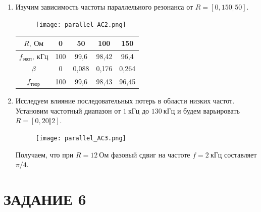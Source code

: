 \documentclass[a4paper, 12pt]{article}%
\begin{document}
\begin{enumerate}
\item Изучим зависимость частоты параллельного резонанса от $R = [0, 150 \Vert 50]$.

\begin{figure}[h!]
\centering
\texttt{[image: parallel\_AC2.png]}
\label{fig:Image1}
\end{figure}

\begin{center}
\begin{tabular}{|c|c|c|c|c|}
\hline
$R, \: \textit{Ом}$ & 0 & 50 & 100 & 150 \\
\hline
$f_{\textit{эксп}}, \: \textit{кГц}$ & 100 & 99,6 & 98,42 & 96,4 \\
\hline
$\beta$ & 0 & 0,088 & 0,176 & 0,264 \\
\hline
$f_{\textit{теор}}$ & 100 & 99,6 & 98,43 & 96,45 \\
\hline
\end{tabular}
\end{center}

\item Исследуем влияние последовательных потерь в области низких частот. Установим частотный диапазон от $1 \: \textit{кГц}$ до $130 \: \textit{кГц}$ и будем варьировать $R = [0,20 \Vert 2]$.

\begin{figure}[h!]
\centering
\texttt{[image: parallel\_AC3.png]}
\label{fig:Image1}
\end{figure}

Получаем, что при $R = 12 \: \textit{Ом}$ фазовый сдвиг на частоте $f = 2 \: \textit{кГц}$ составляет $\pi / 4$.

\end{enumerate}

\section*{ЗАДАНИЕ 6}
\end{document}
